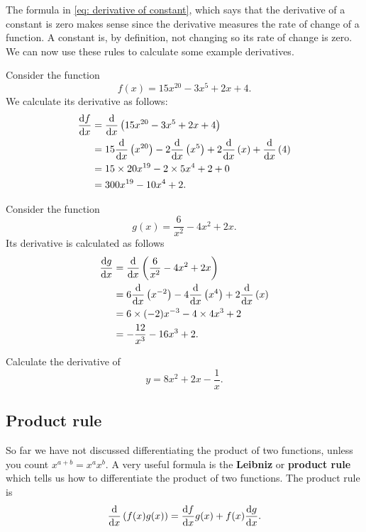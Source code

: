 The formula in \cref{eq: derivative of constant}, which says that the derivative of a constant is zero makes sense since the derivative measures the rate of change of a function. A constant is, by definition, not changing so its rate of change is zero.\\

We can now use these rules to calculate some example derivatives.
\begin{ex}
Consider the function 
\begin{equation*}
f(x)=15x^{20}-3x^{5}+2x+4.
\end{equation*}
We calculate its derivative as follows:
\begin{align*}
\frac{\mathrm{d} f}{\mathrm{d} x}	&=\frac{\mathrm{d}}{\mathrm{d} x}\left(15x^{20}-3x^{5}+2x+4\right)\\
			&=15\frac{\mathrm{d}}{\mathrm{d} x}\left(x^{20}\right)-2\frac{\mathrm{d}}{\mathrm{d} x}\left(x^{5}\right)+2\frac{\mathrm{d}}{\mathrm{d} x}\left(x\right)+\frac{\mathrm{d}}{\mathrm{d} x}\left(4\right)\\
			&=15 \times 20 x^{19}-2\times 5 x^{4}+2 +0\\
			&=300 x^{19}-10x^{4}+2.
\end{align*}
\end{ex}

\begin{ex}
Consider the function 
\begin{equation*}
g(x)=\frac{6}{x^{2}}-4x^{2}+2x.
\end{equation*}
Its derivative is calculated as follows 
\begin{align*}
\frac{\mathrm{d} g}{\mathrm{d} x}	&=\frac{\mathrm{d}}{\mathrm{d} x}\left(\frac{6}{x^{2}}-4x^{2}+2x\right)\\
			&=6\frac{\mathrm{d}}{\mathrm{d} x}\left(x^{-2}\right)-4\frac{\mathrm{d}}{\mathrm{d} x}\left(x^{4}\right)+2\frac{\mathrm{d} }{\mathrm{d} x}\left(x\right)\\
			&=6\times (-2) x^{-3}-4\times 4 x^{3}+2\\
			&=-\frac{12}{x^{3}}-16x^{3}+2.
\end{align*}
\end{ex}

\begin{exercise}
Calculate the derivative of 
\begin{equation*}
y=8x^{2}+2x-\frac{1}{x}.
\end{equation*}
\end{exercise}

\subsection*{Product rule}
So far we have not discussed differentiating the product of two functions, unless you count $x^{a+b}=x^{a}x^{b}$. A very useful formula is the \textbf{Leibniz} or \textbf{product rule} which tells us how to differentiate the product of two functions. The product rule is
\begin{equation}
\frac{\mathrm{d} }{\mathrm{d} x}\left(f(x)g(x)\right)=\frac{\mathrm{d} f}{\mathrm{d} x}g(x)+f(x)\frac{\mathrm{d} g}{\mathrm{d} x}. \label{eq: product rule}
\end{equation}

